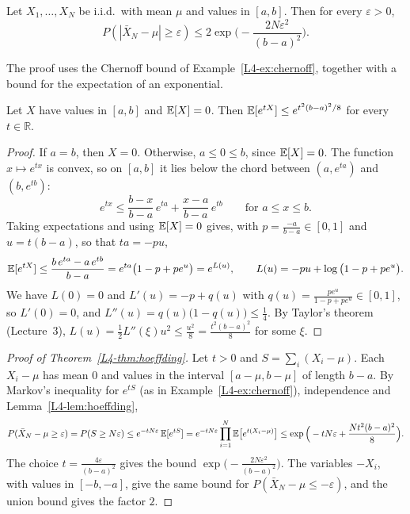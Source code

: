 \begin{theorem}\label{L4-thm:hoeffding}
    Let $X_1, \ldots, X_N$ be i.i.d.\ with mean $\mu$ and values in $[a, b]$. Then for every $\varepsilon > 0$,
    \[P(|\bar X_N - \mu| \geq \varepsilon) \leq 2\exp\Big(-\frac{2N\varepsilon^2}{(b - a)^2}\Big).\]
\end{theorem}

The proof uses the Chernoff bound of Example~\ref{L4-ex:chernoff}, together with a bound for the expectation of an exponential.

\begin{lemma}\label{L4-lem:hoeffding}
    Let $X$ have values in $[a, b]$ and $\mathbb{E}[X] = 0$. Then $\mathbb{E}[e^{tX}] \leq e^{t^2(b - a)^2/8}$ for every $t \in \mathbb{R}$.
\end{lemma}

\begin{proof}
    If $a = b$, then $X = 0$. Otherwise, $a \leq 0 \leq b$, since $\mathbb{E}[X] = 0$. The function $x \mapsto e^{tx}$ is convex, so on $[a, b]$ it lies below the chord between $(a, e^{ta})$ and $(b, e^{tb})$:
    \[e^{tx} \leq \frac{b - x}{b - a}\,e^{ta} + \frac{x - a}{b - a}\,e^{tb} \qquad \text{for } a \leq x \leq b.\]
    Taking expectations and using $\mathbb{E}[X] = 0$ gives, with $p = \frac{-a}{b - a} \in [0, 1]$ and $u = t(b - a)$, so that $ta = -pu$,
    \[\mathbb{E}[e^{tX}] \leq \frac{b\,e^{ta} - a\,e^{tb}}{b - a} = e^{ta}\big(1 - p + pe^{u}\big) = e^{L(u)}, \qquad L(u) = -pu + \log\big(1 - p + pe^{u}\big).\]
    We have $L(0) = 0$ and $L'(u) = -p + q(u)$ with $q(u) = \frac{pe^u}{1 - p + pe^u} \in [0, 1]$, so $L'(0) = 0$, and $L''(u) = q(u)\big(1 - q(u)\big) \leq \frac{1}{4}$. By Taylor's theorem (Lecture~3), $L(u) = \frac{1}{2}L''(\xi)u^2 \leq \frac{u^2}{8} = \frac{t^2(b - a)^2}{8}$ for some $\xi$.
\end{proof}

\begin{proof}[Proof of Theorem~\ref{L4-thm:hoeffding}]
    Let $t > 0$ and $S = \sum_i (X_i - \mu)$. Each $X_i - \mu$ has mean $0$ and values in the interval $[a - \mu, b - \mu]$ of length $b - a$. By Markov's inequality for $e^{tS}$ (as in Example~\ref{L4-ex:chernoff}), independence and Lemma~\ref{L4-lem:hoeffding},
    \[P(\bar X_N - \mu \geq \varepsilon) = P(S \geq N\varepsilon) \leq e^{-tN\varepsilon}\,\mathbb{E}[e^{tS}] = e^{-tN\varepsilon}\prod_{i=1}^N \mathbb{E}\big[e^{t(X_i - \mu)}\big] \leq \exp\Big(-tN\varepsilon + \frac{Nt^2(b - a)^2}{8}\Big).\]
    The choice $t = \frac{4\varepsilon}{(b - a)^2}$ gives the bound $\exp\big(-\frac{2N\varepsilon^2}{(b - a)^2}\big)$. The variables $-X_i$, with values in $[-b, -a]$, give the same bound for $P(\bar X_N - \mu \leq -\varepsilon)$, and the union bound gives the factor $2$.
\end{proof}

